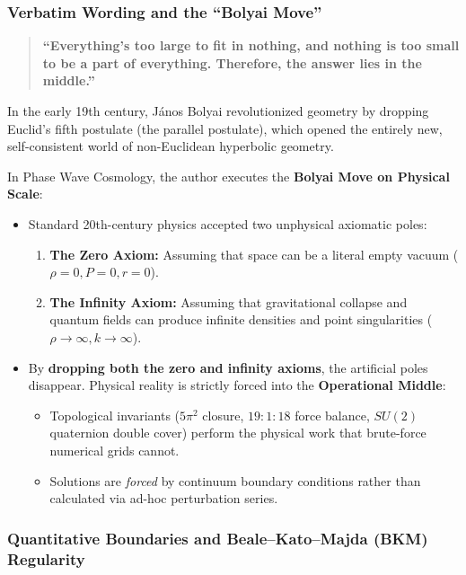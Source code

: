 \documentclass[11pt,a4paper]{article}
\begin{document}
\subsubsection{Verbatim Wording and the ``Bolyai Move''}
\label{subsubsec:bolyai_move}

\begin{quote}
\centering
\textbf{``Everything's too large to fit in nothing, and nothing is too small to be a part of everything. Therefore, the answer lies in the middle.''}
\end{quote}

In the early 19th century, J\'anos Bolyai revolutionized geometry by dropping Euclid's fifth postulate (the parallel postulate), which opened the entirely new, self-consistent world of non-Euclidean hyperbolic geometry.

In Phase Wave Cosmology, the author executes the \textbf{Bolyai Move on Physical Scale}:
\begin{itemize}
    \item Standard 20th-century physics accepted two unphysical axiomatic poles:
    \begin{enumerate}
        \item \textbf{The Zero Axiom:} Assuming that space can be a literal empty vacuum ($\rho = 0, P = 0, r = 0$).
        \item \textbf{The Infinity Axiom:} Assuming that gravitational collapse and quantum fields can produce infinite densities and point singularities ($\rho \to \infty, k \to \infty$).
    \end{enumerate}
    \item By \textbf{dropping both the zero and infinity axioms}, the artificial poles disappear. Physical reality is strictly forced into the \textbf{Operational Middle}:
    \begin{itemize}
        \item Topological invariants ($5\pi^2$ closure, $19:1:18$ force balance, $SU(2)$ quaternion double cover) perform the physical work that brute-force numerical grids cannot.
        \item Solutions are \textit{forced} by continuum boundary conditions rather than calculated via ad-hoc perturbation series.
    \end{itemize}
\end{itemize}

\subsubsection{Quantitative Boundaries and Beale--Kato--Majda (BKM) Regularity}
\label{subsubsec:bkm_regularity}
\end{document}
